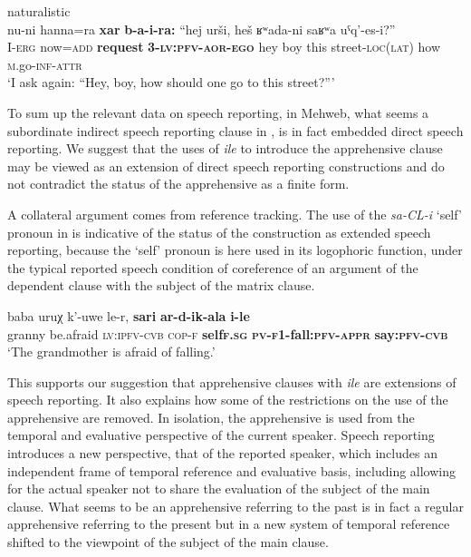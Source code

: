 \documentclass[output=paper,colorlinks,citecolor=brown]{langscibook}
\begin{document}
\ea \label{ex:DD54} \textnormal{naturalistic} \\
\gll nu-ni hanna=ra \textbf{xar} \textbf{b-a-i-ra:} ``hej urši, heš ʁʷada-ni saʁʷa uˤq'-es-i?'' \\
I-\textsc{erg} now=\textsc{add} \textbf{request} \textbf{3-\textsc{lv:pfv-aor-ego}} hey boy this street-\textsc{loc(lat)} how \textsc{m}.go-\textsc{inf-attr} \\
\glt `I ask again: ``Hey, boy, how should one go to this street?''{}'
\z


 To sum up the relevant data on speech reporting, in Mehweb, what seems a subordinate indirect speech reporting clause in , is in fact embedded direct speech reporting. We suggest that the uses of \textit{ile} to introduce the apprehensive clause may be viewed as an extension of direct speech reporting constructions and do not contradict the status of the apprehensive as a finite form. 

A collateral argument comes from reference tracking. The use of the \textit{sa-CL-i} `self' pronoun in  is indicative of the status of the construction as extended speech reporting, because the `self' pronoun is here used in its logophoric function, under the typical reported speech condition of coreference of an argument of the dependent clause with the subject of the matrix clause.


\ea \label{ex:DD55}
\gll baba uruχ k'-uwe le-r, \textbf{sa{\textlangle}r{\textrangle}i} \textbf{ar-d-ik-ala} \textbf{i-le} \\
granny be.afraid \textsc{lv:ipfv-cvb} \textsc{cop-f} \textbf{self{\textlangle}\textsc{f.sg}{\textrangle}} \textbf{\textsc{pv-f1}-fall:\textsc{pfv-appr}} \textbf{say:\textsc{pfv-cvb}} \\
\glt `The grandmother is afraid of falling.'
\z


This supports our suggestion that apprehensive clauses with \textit{ile} are extensions of speech reporting. It also explains how some of the restrictions on the use of the apprehensive are removed. In isolation, the apprehensive is used from the temporal and evaluative perspective of the current speaker. Speech reporting introduces a new perspective, that of the reported speaker, which includes an independent frame of temporal reference and evaluative basis, including allowing for the actual speaker not to share the evaluation of the subject of the main clause. What seems to be an apprehensive referring to the past is in fact a regular apprehensive referring to the present but in a new system of temporal reference shifted to the viewpoint of the subject of the main clause. 
\end{document}
